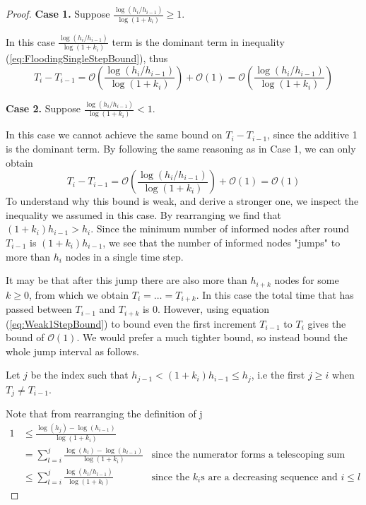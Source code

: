 \documentclass[a4paper,11pt]{article}
\theoremstyle{definition}
\begin{document}
\begin{proof}
	\textbf{Case 1.} Suppose $\frac{\log (h_i/h_{i-1})}{\log(1+k_i)} \geq 1$.

	In this case $\frac{\log (h_i/h_{i-1})}{\log(1+k_i)}$ term is the dominant term in inequality (\ref{eq:FloodingSingleStepBound}), thus
	$$
		T_i - T_{i-1} = \mathcal{O}\left( \frac{\log (h_i/h_{i-1})}{\log(1+k_i) }\right) + \mathcal{O}(1) = \mathcal{O}\left( \frac{\log (h_i/h_{i-1})}{\log(1+k_i) }\right)
	$$

	\textbf{Case 2.} Suppose $\frac{\log (h_i/h_{i-1})}{\log(1+k_i)} < 1$.

	In this case we cannot achieve the same bound on $T_i - T_{i-1}$, since the additive 1 is the dominant term. By following the same reasoning as in Case 1, we can only obtain
	\begin{equation}\label{eq:Weak1StepBound}
		T_i - T_{i-1} = \mathcal{O}\left( \frac{\log (h_i/h_{i-1})}{\log(1+k_i) }\right) + \mathcal{O}(1) = \mathcal{O}(1)
	\end{equation}
	To understand why this bound is weak, and derive a stronger one, we inspect the inequality we assumed in this case. %
	By rearranging we find that $(1+k_i)h_{i-1} > h_i$. Since the minimum number of informed nodes after round $T_{i-1}$ is $(1+k_i)h_{i-1}$, we see that the number of informed nodes "jumps" to more than $h_i$ nodes in a single time step. %

	It may be that after this jump there are also more than $h_{i+k}$ nodes for some $k \geq 0$, from which we obtain $T_i = \dots = T_{i+k}$. In this case the total time that has passed between $T_{i-1}$ and $T_{i+k}$ is 0. However, using equation (\ref{eq:Weak1StepBound}) to bound even the first increment $T_{i-1}$ to $T_i$ gives the bound of $\mathcal{O}(1)$. We would prefer a much tighter bound, so instead bound the whole jump interval as follows. %
	
	Let $j$ be the index such that $h_{j-1} < (1+k_i)h_{i-1} \leq h_j$, i.e the first $j \geq i$ when $T_j \neq T_{i-1}$. %

	Note that from rearranging the definition of j
	\begin{align*}\label{eq:JumpBoundGeq1}
		1 &\leq \frac{\log (h_j) - \log(h_{i-1})}{\log(1+k_i) } \\
		& =\sum_{l=i}^j \frac{\log (h_{l}) - \log(h_{l-1})}{\log(1+k_i) } & \text{since the numerator forms a telescoping sum} \\
		& \leq \sum_{l=i}^j \frac{\log (h_{l}/h_{l-1})}{\log(1+k_l) } & \text{since the } k_i \text{s are a decreasing sequence and } i \leq l
	\end{align*}
	

\end{proof}
\end{document}
